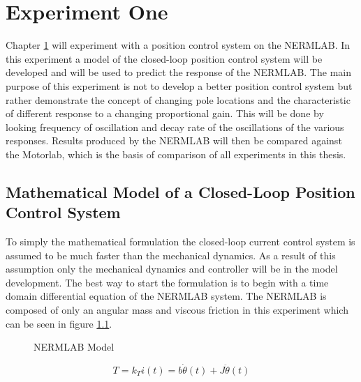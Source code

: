 
\cleardoublepage

\chapter{Experiment One}
\label{chp6}

Chapter \ref{chp6} will experiment with a position control system on the NERMLAB. In this experiment a model of the closed-loop position control system will be developed and will be used to predict the response of the NERMLAB. The main purpose of this experiment is not to develop a better position control system but rather demonstrate the concept of changing pole locations and the characteristic of different response to a changing proportional gain. This will be done by looking frequency of oscillation and decay rate of the oscillations of the various responses. Results produced by the NERMLAB will then be compared against the Motorlab, which is the basis of comparison of all experiments in this thesis. 

\section{Mathematical Model of a Closed-Loop Position Control System}

To simply the mathematical formulation the closed-loop current control system is assumed to be much faster than the mechanical dynamics. As a result of this assumption only the mechanical dynamics and controller will be in the model development.  The best way to start the formulation is to begin with a time domain differential equation of the NERMLAB system. The NERMLAB is composed of only an angular mass and viscous friction in this experiment which can be seen in figure \ref{model}.

\begin{figure}[H]
	\begin{center}
		\caption[NERMLAB Model]{NERMLAB Model}
		\label{model}
		
	\end{center}
\end{figure}

\begin{equation} \label{eq:4.1}
T = k_T i(t) = b \dot \theta(t) + J \ddot \theta(t)
\end{equation}


